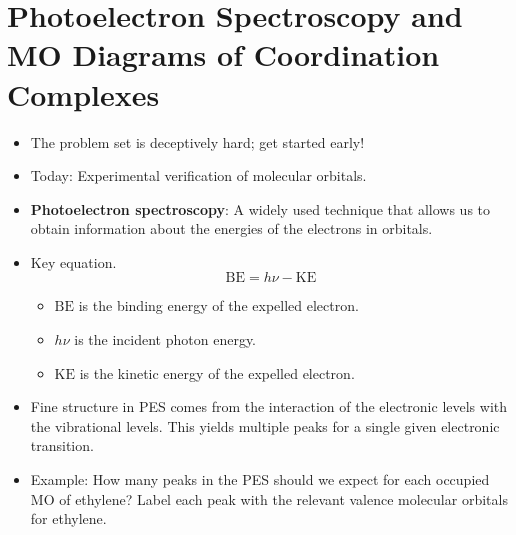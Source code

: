 \documentclass[../notes.tex]{subfiles}
\begin{document}
\section{Photoelectron Spectroscopy and MO Diagrams of Coordination Complexes}
\begin{itemize}
    \item {}The problem set is deceptively hard; get started early!
    \item Today: Experimental verification of molecular orbitals.
    \item \textbf{Photoelectron spectroscopy}: A widely used technique that allows us to obtain information about the energies of the electrons in orbitals.
    \item Key equation.
    \begin{equation*}
        \text{BE} = h\nu-\text{KE}
    \end{equation*}
    \begin{itemize}
        \item $\text{BE}$ is the binding energy of the expelled electron.
        \item $h\nu$ is the incident photon energy.
        \item $\text{KE}$ is the kinetic energy of the expelled electron.
    \end{itemize}
    \item Fine structure in PES comes from the interaction of the electronic levels with the vibrational levels. This yields multiple peaks for a single given electronic transition.
    \item Example: How many peaks in the PES should we expect for each occupied MO of ethylene? Label each peak with the relevant valence molecular orbitals for ethylene.
    \begin{figure}[h!]
        \centering
\end{figure}
\end{itemize}
\end{document}
